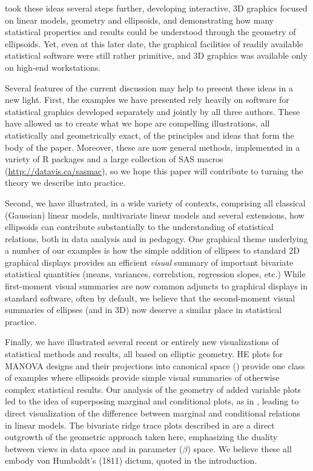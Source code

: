 \citet{Monette:90}
took these ideas several steps further, developing interactive, 3D graphics focused on linear
models, geometry and ellipsoids, and demonstrating how many statistical properties
and results could be understood through the geometry of ellipsoids.  Yet, even at this
later date, the graphical facilities of readily available statistical software were still
rather primitive, and 3D graphics was available only on high-end workstations.
 

Several features of the current discussion may help to present these ideas in a
new light.  First, the examples we have presented rely heavily on software for 
statistical graphics developed separately and jointly by all three authors.
These have allowed us to create what we hope are compelling illustrations,
all statistically and geometrically exact, of the principles and ideas that
form the body of the paper.  Moreover, these are now general methods, implemented
in a variety of R packages
\citep{car,heplots1}
and a large collection of SAS macros (\url{http://datavis.ca/sasmac}),
so we hope this paper will contribute to turning the theory we describe
into practice.

Second, we have illustrated, in a wide variety of contexts,
comprising all classical (Gaussian) linear models, multivariate linear models
and several extensions,
how ellipsoids can contribute substantially to the understanding of statistical
relations, both in data analysis and in pedagogy.  One graphical theme underlying
a number of our examples is how the simple addition of ellipses to standard 2D graphical
displays provides an efficient \emph{visual} summary of important bivariate
statistical quantities (means, variances, correlation, regression slopes, etc.)
While first-moment visual summaries are now common adjuncts to graphical displays
in standard software, often by default, we believe that the second-moment visual summaries
of ellipses (and in 3D)
now deserve a similar place in statistical practice. 

Finally, we have illustrated several recent or entirely new visualizations of 
statistical methods and results, all based on elliptic geometry.
HE plots for MANOVA designs \citep{Friendly:07:manova}
and their projections into canonical space ()
provide one class of examples where ellipsoids provide simple visual summaries of
otherwise complex statistical results.
Our analysis of the geometry of added variable plots led to the idea of superposing
marginal and conditional plots, as in , leading to
direct visualization of the difference between marginal and conditional relations
in linear models.
The bivariate ridge trace plots described in  are a direct outgrowth
of the geometric approach taken here, emphasizing the duality between views in data
space and in parameter ($\beta$) space.
We believe these all embody von Humboldt's (1811) dictum, quoted in the introduction.





